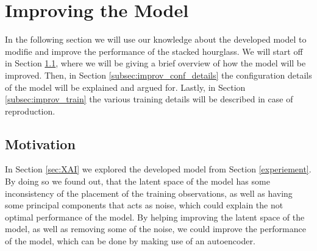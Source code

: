 \documentclass[./main.tex]{subfiles}
\begin{document}
\section{Improving the Model}\label{sec:improving}
In the following section we will use our knowledge about the developed model to modifie and improve the performance of the stacked hourglass. We will start off in Section \ref{subsec:improv_motivation}, where we will be giving a brief overview of how the model will be improved. Then, in Section \ref{subsec:improv_conf_details} the configuration details of the model will be explained and argued for. Lastly, in Section \ref{subsec:improv_train} the various training details will be described in case of reproduction.

\subsection{Motivation}\label{subsec:improv_motivation}
In Section \ref{sec:XAI} we explored the developed model from Section \ref{experiement}. By doing so we found out, that the latent space of the model has some inconsistency of the placement of the training observations, as well as having some principal components that acts as noise, which could explain the not optimal performance of the model. By helping improving the latent space of the model, as well as removing some of the noise, we could improve the performance of the model, which can be done by making use of an autoencoder.
\end{document}

